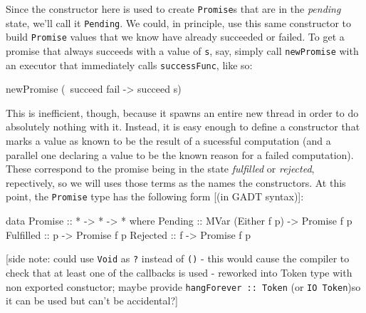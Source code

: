 \documentclass[sigplan,screen]{acmart}
\newcommand{\lit}[1]{\lstinline{#1}}
\begin{document}
Since the constructor here is used to create \lit{Promise}s that are in the \emph{pending} state, we'll call it \lit{Pending}.  We could, in principle, use this same constructor to build \lit{Promise} values that we know have already succeeded or failed.  To get a promise that always succeeds with a value of \lit s, say, simply call \lit{newPromise} with an executor that immediately calls \lit{successFunc}, like so:
\begin{code}
newPromise (\ succeed fail -> succeed s)
\end{code}
This is inefficient, though, because it spawns an entire new thread in order to do absolutely nothing with it.  Instead, it is easy enough to define a constructor that marks a value as known to be the result of a sucessful computation (and a parallel one declaring a value to be the known reason for a failed computation).  These correspond to the promise being in the state \emph{fulfilled} or \emph{rejected}, repectively, so we will uses those terms as the names the constructors.  At this point, the \lit{Promise} type has the following form [(in GADT syntax)]:
\begin{code}
data Promise :: * -> * -> * where
  Pending :: MVar (Either f p) -> Promise f p
  Fulfilled :: p -> Promise f p
  Rejected :: f -> Promise f p
\end{code}
[side note: could use \lit{Void} as \lit ? instead of \lit{()} - this would cause the compiler to check that at least one of the callbacks is used - reworked into Token type with non exported constuctor; maybe provide \lit{hangForever :: Token} (or \lit{IO Token})so it can be used but can't be accidental?]
\end{document}
